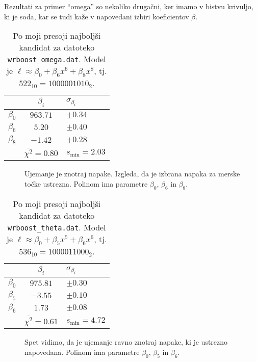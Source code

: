 \documentclass[a4 paper, 12pt]{article}
\begin{document}
Rezultati za primer "`omega"' so nekoliko druga\v cni, ker imamo v bistvu krivuljo, ki je soda, kar se tudi ka\v ze
v napovedani izbiri koeficientov $\beta$.
\begin{table}[H]\centering
	\caption{Po moji presoji najbolj\v si kandidat za datoteko {\tt wrboost\_omega.dat}. Model je $\ell \approx
		\beta_0 + \beta_6 x^6 + \beta_8 x^8$, tj. $522_{10} = 1000001010_{2}$.}
	\begin{tabular}{r|c|l}
			& $\beta_i$ & $\sigma_{\beta_i}$  \\
		\hline \hline
		$\beta_0$ & $963.71$ & $\pm 0.34$ \\
		$\beta_6$ & $5.20$   & $\pm 0.40$ \\
		$\beta_8$ & $-1.42$  & $\pm 0.28$ \\
		\hline
			& $\overline{\chi^2} = 0.80$ & $s_\text{min} = 2.03$
	\end{tabular}
	\label{tab2-2}
\end{table}

\begin{figure}[H]\centering
	
	\caption{Ujemanje je znotraj napake. Izgleda, da je izbrana napaka za merske to\v cke ustrezna. Polinom ima
		parametre $\beta_0$, $\beta_6$ in $\beta_8$.}
	\label{plt2}
\end{figure}

\begin{table}[H]\centering
	\caption{Po moji presoji najbolj\v si kandidat za datoteko {\tt wrboost\_theta.dat}. Model je $\ell \approx
		\beta_0 + \beta_5 x^5 + \beta_6 x^6$, tj. $536_{10} = 1000011000_{2}$.}
	\begin{tabular}{r|c|l}
			& $\beta_i$ & $\sigma_{\beta_i}$  \\
		\hline \hline
		$\beta_0$ & $975.81$ & $\pm 0.30$ \\
		$\beta_5$ & $-3.55$  & $\pm 0.10$ \\
		$\beta_6$ & $1.73$   & $\pm 0.08$ \\
		\hline
			& $\overline{\chi^2} = 0.61$ & $s_\text{min} = 4.72$
	\end{tabular}
	\label{tab2-3}
\end{table}

\begin{figure}[H]\centering
	
	\caption{Spet vidimo, da je ujemanje ravno znotraj napake, ki je ustrezno napovedana. Polinom ima parametre
		$\beta_0$, $\beta_5$ in $\beta_6$.}
	\label{plt3}
\end{figure}
\end{document}
